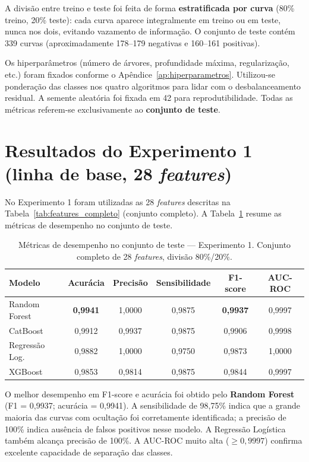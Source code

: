 \documentclass[msc]{on} %
\begin{document}
A divisão entre treino e teste foi feita de forma \textbf{estratificada por curva} (80\% treino, 20\% teste): cada curva aparece integralmente em treino ou em teste, nunca nos dois, evitando vazamento de informação. O conjunto de teste contém 339 curvas (aproximadamente 178--179 negativas e 160--161 positivas).

Os hiperparâmetros (número de árvores, profundidade máxima, regularização, etc.) foram fixados conforme o Apêndice~\ref{ap:hiperparametros}. Utilizou-se ponderação das classes nos quatro algoritmos para lidar com o desbalanceamento residual. A semente aleatória foi fixada em 42 para reprodutibilidade. Todas as métricas referem-se exclusivamente ao \textbf{conjunto de teste}.

\section{Resultados do Experimento 1 (linha de base, 28 \textit{features})}
\label{sec:resultados_exp1}

No Experimento 1 foram utilizadas as 28 \textit{features} descritas na Tabela~\ref{tab:features_completo} (conjunto completo). A Tabela~\ref{tab:metricas_1} resume as métricas de desempenho no conjunto de teste.

\begin{table}[htbp]
\centering
\caption{Métricas de desempenho no conjunto de teste --- Experimento 1. Conjunto completo de 28 \textit{features}, divisão 80\%/20\%.}
\label{tab:metricas_1}
\begin{tabular}{lccccc}
\hline
\textbf{Modelo} & \textbf{Acurácia} & \textbf{Precisão} & \textbf{Sensibilidade} & \textbf{F1-score} & \textbf{AUC-ROC} \\
\hline
Random Forest   & \textbf{0,9941} & 1,0000 & 0,9875 & \textbf{0,9937} & 0,9997 \\
CatBoost        & 0,9912 & 0,9937 & 0,9875 & 0,9906 & 0,9998 \\
Regressão Log.  & 0,9882 & 1,0000 & 0,9750 & 0,9873 & 1,0000 \\
XGBoost         & 0,9853 & 0,9814 & 0,9875 & 0,9844 & 0,9997 \\
\hline
\end{tabular}
\end{table}

O melhor desempenho em F1-score e acurácia foi obtido pelo \textbf{Random Forest} (F1 = 0,9937; acurácia = 0,9941). A sensibilidade de 98,75\% indica que a grande maioria das curvas com ocultação foi corretamente identificada; a precisão de 100\% indica ausência de falsos positivos nesse modelo. A Regressão Logística também alcança precisão de 100\%. A AUC-ROC muito alta ($\geq 0{,}9997$) confirma excelente capacidade de separação das classes.
\end{document}
